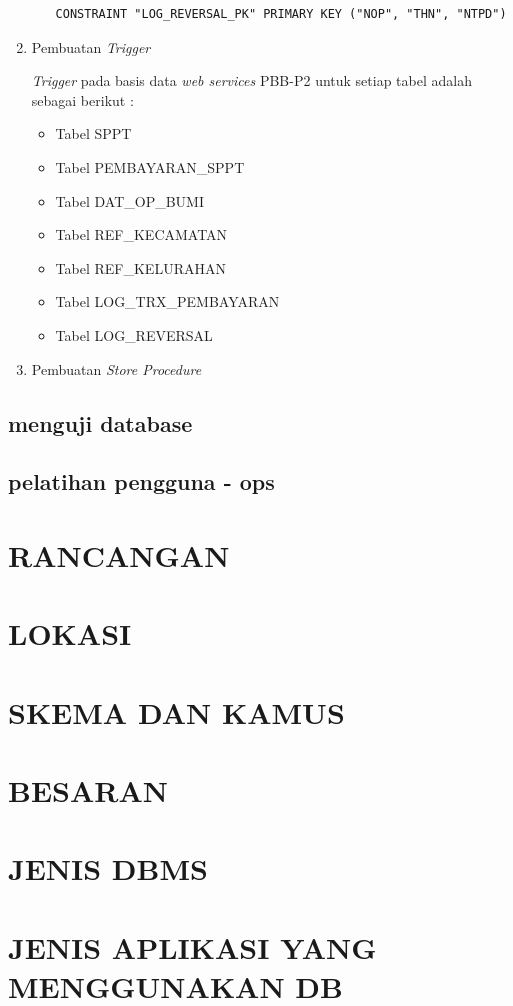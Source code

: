 \documentclass[pdftex,12pt, oneside]{article}
\begin{document}
\begin{enumerate}[1.]
\begin{itemize}
\begin{lstlisting}
CONSTRAINT "LOG_REVERSAL_PK" PRIMARY KEY ("NOP", "THN", "NTPD")
\end{lstlisting}
	\end{itemize}
	
	\item Pembuatan \textit{Trigger}
	
	\textit{Trigger} pada basis data \textit{web services} PBB-P2 untuk setiap tabel adalah sebagai berikut :
	
	\begin{itemize}
	\item Tabel SPPT
	\item Tabel PEMBAYARAN\_SPPT
	\item Tabel DAT\_OP\_BUMI
	\item Tabel REF\_KECAMATAN
	\item Tabel REF\_KELURAHAN
	\item Tabel LOG\_TRX\_PEMBAYARAN
	\item Tabel LOG\_REVERSAL
	\end{itemize}
	
	\item Pembuatan \textit{Store Procedure}
\end{enumerate}

\subsection{menguji database}

\subsection{pelatihan pengguna - ops}


\section{RANCANGAN}


\section{LOKASI}

\section{SKEMA DAN KAMUS}

\section{BESARAN}

\section{JENIS DBMS}

\section{JENIS APLIKASI YANG MENGGUNAKAN DB}
\end{document}

